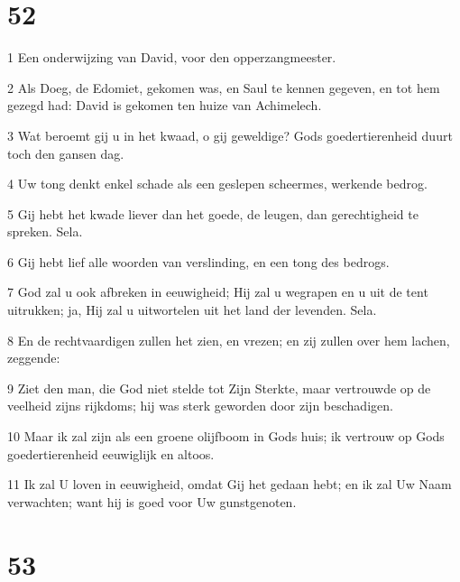 \chapter{52}

\par 1 Een onderwijzing van David, voor den opperzangmeester.
\par 2 Als Doeg, de Edomiet, gekomen was, en Saul te kennen gegeven, en tot hem gezegd had: David is gekomen ten huize van Achimelech.
\par 3 Wat beroemt gij u in het kwaad, o gij geweldige? Gods goedertierenheid duurt toch den gansen dag.
\par 4 Uw tong denkt enkel schade als een geslepen scheermes, werkende bedrog.
\par 5 Gij hebt het kwade liever dan het goede, de leugen, dan gerechtigheid te spreken. Sela.
\par 6 Gij hebt lief alle woorden van verslinding, en een tong des bedrogs.
\par 7 God zal u ook afbreken in eeuwigheid; Hij zal u wegrapen en u uit de tent uitrukken; ja, Hij zal u uitwortelen uit het land der levenden. Sela.
\par 8 En de rechtvaardigen zullen het zien, en vrezen; en zij zullen over hem lachen, zeggende:
\par 9 Ziet den man, die God niet stelde tot Zijn Sterkte, maar vertrouwde op de veelheid zijns rijkdoms; hij was sterk geworden door zijn beschadigen.
\par 10 Maar ik zal zijn als een groene olijfboom in Gods huis; ik vertrouw op Gods goedertierenheid eeuwiglijk en altoos.
\par 11 Ik zal U loven in eeuwigheid, omdat Gij het gedaan hebt; en ik zal Uw Naam verwachten; want hij is goed voor Uw gunstgenoten.

\chapter{53}

